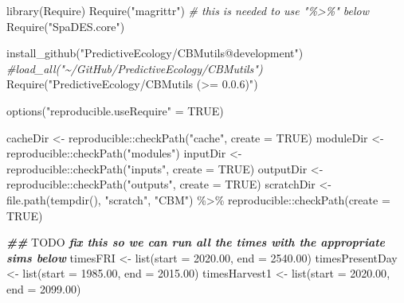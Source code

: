 \documentclass[
]{article}
\newenvironment{Shaded}{\begin{snugshade}}{\end{snugshade}}
\newcommand{\AlertTok}[1]{\textcolor[rgb]{0.94,0.16,0.16}{#1}}
\newcommand{\AttributeTok}[1]{\textcolor[rgb]{0.77,0.63,0.00}{#1}}
\newcommand{\CommentTok}[1]{\textcolor[rgb]{0.56,0.35,0.01}{\textit{#1}}}
\newcommand{\ConstantTok}[1]{\textcolor[rgb]{0.00,0.00,0.00}{#1}}
\newcommand{\DocumentationTok}[1]{\textcolor[rgb]{0.56,0.35,0.01}{\textbf{\textit{#1}}}}
\newcommand{\FloatTok}[1]{\textcolor[rgb]{0.00,0.00,0.81}{#1}}
\newcommand{\FunctionTok}[1]{\textcolor[rgb]{0.00,0.00,0.00}{#1}}
\newcommand{\NormalTok}[1]{#1}
\newcommand{\OtherTok}[1]{\textcolor[rgb]{0.56,0.35,0.01}{#1}}
\newcommand{\SpecialCharTok}[1]{\textcolor[rgb]{0.00,0.00,0.00}{#1}}
\newcommand{\StringTok}[1]{\textcolor[rgb]{0.31,0.60,0.02}{#1}}
\begin{document}
\begin{Shaded}
\begin{Highlighting}[]
\FunctionTok{library}\NormalTok{(Require)}
\FunctionTok{Require}\NormalTok{(}\StringTok{"magrittr"}\NormalTok{) }\CommentTok{\# this is needed to use "\%\textgreater{}\%" below}
\FunctionTok{Require}\NormalTok{(}\StringTok{"SpaDES.core"}\NormalTok{)}

\FunctionTok{install\_github}\NormalTok{(}\StringTok{"PredictiveEcology/CBMutils@development"}\NormalTok{)}
\CommentTok{\#load\_all("\textasciitilde{}/GitHub/PredictiveEcology/CBMutils")}
\FunctionTok{Require}\NormalTok{(}\StringTok{"PredictiveEcology/CBMutils (\textgreater{}= 0.0.6)"}\NormalTok{)}

\FunctionTok{options}\NormalTok{(}\StringTok{"reproducible.useRequire"} \OtherTok{=} \ConstantTok{TRUE}\NormalTok{)}

\NormalTok{cacheDir }\OtherTok{\textless{}{-}}\NormalTok{ reproducible}\SpecialCharTok{::}\FunctionTok{checkPath}\NormalTok{(}\StringTok{"cache"}\NormalTok{, }\AttributeTok{create =} \ConstantTok{TRUE}\NormalTok{)}
\NormalTok{moduleDir }\OtherTok{\textless{}{-}}\NormalTok{ reproducible}\SpecialCharTok{::}\FunctionTok{checkPath}\NormalTok{(}\StringTok{"modules"}\NormalTok{)}
\NormalTok{inputDir }\OtherTok{\textless{}{-}}\NormalTok{ reproducible}\SpecialCharTok{::}\FunctionTok{checkPath}\NormalTok{(}\StringTok{"inputs"}\NormalTok{, }\AttributeTok{create =} \ConstantTok{TRUE}\NormalTok{)}
\NormalTok{outputDir }\OtherTok{\textless{}{-}}\NormalTok{ reproducible}\SpecialCharTok{::}\FunctionTok{checkPath}\NormalTok{(}\StringTok{"outputs"}\NormalTok{, }\AttributeTok{create =} \ConstantTok{TRUE}\NormalTok{)}
\NormalTok{scratchDir }\OtherTok{\textless{}{-}} \FunctionTok{file.path}\NormalTok{(}\FunctionTok{tempdir}\NormalTok{(), }\StringTok{"scratch"}\NormalTok{, }\StringTok{"CBM"}\NormalTok{) }\SpecialCharTok{\%\textgreater{}\%}\NormalTok{ reproducible}\SpecialCharTok{::}\FunctionTok{checkPath}\NormalTok{(}\AttributeTok{create =} \ConstantTok{TRUE}\NormalTok{)}

\DocumentationTok{\#\# }\AlertTok{TODO}\DocumentationTok{ fix this so we can run all the times with the appropriate sims below}
\NormalTok{timesFRI }\OtherTok{\textless{}{-}} \FunctionTok{list}\NormalTok{(}\AttributeTok{start =} \FloatTok{2020.00}\NormalTok{, }\AttributeTok{end =} \FloatTok{2540.00}\NormalTok{)}
\NormalTok{timesPresentDay }\OtherTok{\textless{}{-}} \FunctionTok{list}\NormalTok{(}\AttributeTok{start =} \FloatTok{1985.00}\NormalTok{, }\AttributeTok{end =} \FloatTok{2015.00}\NormalTok{)}
\NormalTok{timesHarvest1 }\OtherTok{\textless{}{-}} \FunctionTok{list}\NormalTok{(}\AttributeTok{start =} \FloatTok{2020.00}\NormalTok{, }\AttributeTok{end =} \FloatTok{2099.00}\NormalTok{)}



\end{Highlighting}
\end{Shaded}
\end{document}
